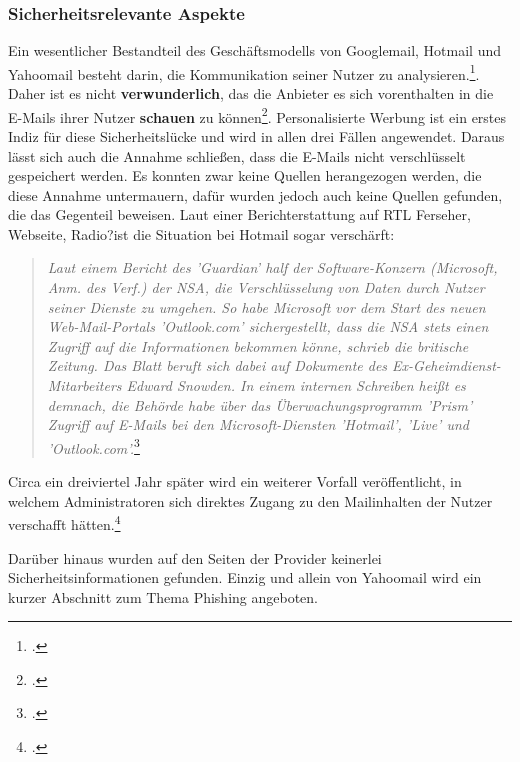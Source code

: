 \documentclass  [paper=a4,
				fontsize=12pt,
				listof=totoc,
				bibliography=totoc
				]{scrreprt}
\begin{document}
			\subsubsection{Sicherheitsrelevante Aspekte}
			Ein wesentlicher Bestandteil des Geschäftsmodells von Googlemail, Hotmail und Yahoomail besteht darin, die Kommunikation seiner Nutzer zu analysieren.\footcite[Vgl.][]{Kirsch}. Daher ist es nicht \textbf{verwunderlich}, das die Anbieter es sich vorenthalten in die E-Mails ihrer Nutzer \textbf{schauen} zu können\footcite[Vgl.][]{Schwan}. Personalisierte Werbung ist ein erstes Indiz für diese Sicherheitslücke 
			und wird in allen drei Fällen angewendet. Daraus lässt sich auch die Annahme schließen, dass die E-Mails nicht verschlüsselt gespeichert werden. Es konnten zwar keine Quellen herangezogen werden, die diese Annahme untermauern, dafür wurden jedoch auch keine Quellen gefunden, die das Gegenteil beweisen.
			Laut einer Berichterstattung auf RTL \color{darkred}Ferseher, Webseite, Radio?\color{black}ist die Situation bei Hotmail sogar verschärft:
			\begin{quote}

			\textit{Laut einem Bericht des 'Guardian' half der Software-Konzern (Microsoft, Anm. des Verf.) der NSA, die Verschlüsselung von Daten durch Nutzer seiner Dienste zu umgehen. So habe Microsoft vor dem Start des neuen Web-Mail-Portals 'Outlook.com' sichergestellt, dass die NSA stets einen Zugriff auf die Informationen bekommen könne, schrieb die britische Zeitung. Das Blatt beruft sich dabei auf Dokumente des Ex-Geheimdienst- Mitarbeiters Edward Snowden. In einem internen Schreiben heißt es demnach, die Behörde habe über das Überwachungsprogramm 'Prism' Zugriff auf E-Mails bei den Microsoft-Diensten 'Hotmail', 'Live' und 'Outlook.com'.}\footcite[Vgl.][]{Guardian}
			\end{quote}  
			Circa ein dreiviertel Jahr später wird ein weiterer Vorfall veröffentlicht, in welchem Administratoren sich direktes Zugang zu den Mailinhalten der Nutzer verschafft hätten.\footcite[Vgl.][]{Mailbox2014M}
			\medskip
			
			Darüber hinaus wurden auf den Seiten der Provider keinerlei Sicherheitsinformationen gefunden. Einzig und allein von Yahoomail wird ein kurzer Abschnitt zum Thema Phishing angeboten.
			
\end{document}

